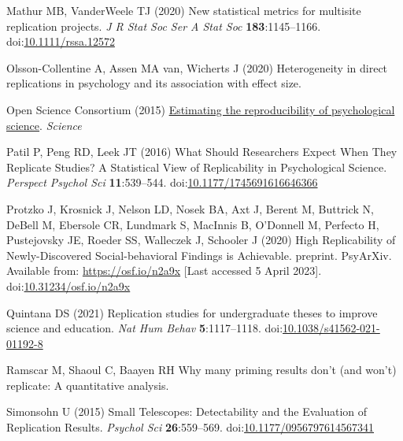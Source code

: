 \documentclass[
  english,
  a4paper,
]{article}
\newlength{\cslhangindent}
\newlength{\cslentryspacingunit} %
\newenvironment{CSLReferences}[2] %
 {%
  \setlength{\parindent}{0pt}
  \ifodd #1
  \let\oldpar\par
  \def\par{\hangindent=\cslhangindent\oldpar}
  \fi
  \setlength{\parskip}{#2\cslentryspacingunit}
 }%
 {}
\begin{document}
\begin{CSLReferences}{1}{0}
\leavevmode{}%
Mathur MB, VanderWeele TJ (2020) New statistical metrics for multisite replication projects. \emph{J R Stat Soc Ser A Stat Soc} \textbf{183}:1145--1166. doi:\href{https://doi.org/10.1111/rssa.12572}{10.1111/rssa.12572}

\leavevmode{}%
Olsson-Collentine A, Assen MA van, Wicherts J (2020) Heterogeneity in direct replications in psychology and its association with effect size.

\leavevmode{}%
Open Science Consortium (2015) \href{https://www.science.org/doi/full/10.1126/science.aac4716?casa_token=IJ35TwwlcjsAAAAA\%3AqiP68QbVAHleIg9zD3WugKWuV6Oa5rswS0VQnDsCq5I14ME4WIQabNGVD_T6SBSuAt6voVHNnWc0sw}{Estimating the reproducibility of psychological science}. \emph{Science}

\leavevmode{}%
Patil P, Peng RD, Leek JT (2016) What {Should Researchers Expect When They Replicate Studies}? {A Statistical View} of {Replicability} in {Psychological Science}. \emph{Perspect Psychol Sci} \textbf{11}:539--544. doi:\href{https://doi.org/10.1177/1745691616646366}{10.1177/1745691616646366}

\leavevmode{}%
Protzko J, Krosnick J, Nelson LD, Nosek BA, Axt J, Berent M, Buttrick N, DeBell M, Ebersole CR, Lundmark S, MacInnis B, O'Donnell M, Perfecto H, Pustejovsky JE, Roeder SS, Walleczek J, Schooler J (2020) High {Replicability} of {Newly-Discovered Social-behavioral Findings} is {Achievable}. preprint. {PsyArXiv}. Available from: \url{https://osf.io/n2a9x} {[}Last accessed 5 April 2023{]}. doi:\href{https://doi.org/10.31234/osf.io/n2a9x}{10.31234/osf.io/n2a9x}

\leavevmode{}%
Quintana DS (2021) Replication studies for undergraduate theses to improve science and education. \emph{Nat Hum Behav} \textbf{5}:1117--1118. doi:\href{https://doi.org/10.1038/s41562-021-01192-8}{10.1038/s41562-021-01192-8}

\leavevmode{}%
Ramscar M, Shaoul C, Baayen RH Why many priming results don't (and won't) replicate: {A} quantitative analysis.

\leavevmode{}%
Simonsohn U (2015) Small {Telescopes}: {Detectability} and the {Evaluation} of {Replication Results}. \emph{Psychol Sci} \textbf{26}:559--569. doi:\href{https://doi.org/10.1177/0956797614567341}{10.1177/0956797614567341}


\end{CSLReferences}
\end{document}
